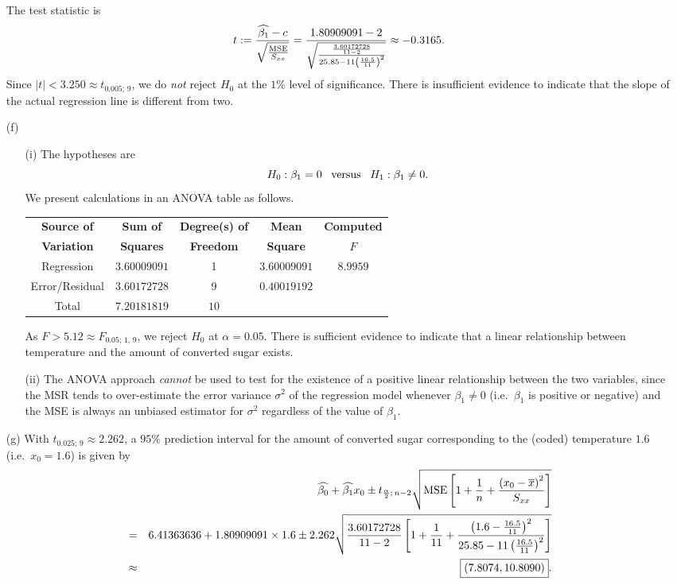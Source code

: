 \documentclass[11pt]{article}
\begin{document}
\begin{enumerate}
$$$$
The test statistic is
$$
t := \frac{\widehat{\beta_1} - c}{\sqrt{\frac{{\rm MSE}}{S_{xx}}}} = \frac{1.80909091 - 2}{\sqrt{\frac{\frac{3.60172728}{11 - 2}}{25.85 - 11\left(\frac{16.5}{11}\right)^2}}} \approx -0.3165.
$$
Since $|t| < 3.250 \approx t_{0.005;\,9}$, we do {\em not\/} reject $H_0$ at the $1\%$ level of significance. There is insufficient evidence to indicate that the slope of the actual regression line is different from two.
\item[(f)]
\begin{enumerate}
\item[(i)]
The hypotheses are
$$
H_0 : \beta_1 = 0 \ \ \, {\rm versus} \ \ \,  H_1 : \beta_1 \ne 0.
$$
We present calculations in an ANOVA table as follows.
\begin{center}
\begin{tabular}{|ccccc|} \hline
{\bf Source of} & {\bf Sum of} & {\bf Degree(s) of} & {\bf Mean} & {\bf Computed} \\
{\bf Variation} & {\bf Squares} & {\bf Freedom} & {\bf Square} & {\bf $F$} \\ \hline\hline
Regression & $3.60009091$ & 1 & $3.60009091$ & $8.9959$  \\
Error/Residual & $3.60172728$  & 9 & $0.40019192$ & \\ \hline
Total & $7.20181819$ & $10$ & & \\ \hline
\end{tabular}
\end{center}
As $F > 5.12 \approx F_{0.05;\,1,\,9}$, we reject $H_0$ at $\alpha = 0.05$. There is sufficient evidence to indicate that a linear relationship between temperature and the amount of converted sugar exists.
\item[(ii)]
The ANOVA approach {\em cannot\/} be used to test for the existence of a positive linear relationship between the two variables, since the MSR tends to over-estimate the error variance $\sigma^2$ of the regression model whenever $\beta_1 \ne 0$ (i.e.~$\beta_1$ is positive or negative) and the MSE is always an unbiased estimator for $\sigma^2$ regardless of the value of $\beta_1$.
\end{enumerate}
\item[(g)]
With $t_{0.025;\,9} \approx 2.262$, a $95\%$ prediction interval for the amount of converted sugar corresponding to the (coded) temperature $1.6$ (i.e.~$x_0 = 1.6$) is given by
\begin{eqnarray*}
 & & \widehat{\beta_0} + \widehat{\beta_1}x_0 \pm t_{\frac{\alpha}{2};\,n - 2}\sqrt{{\rm MSE}\left[1 + \frac{1}{n} + \frac{\left(x_0 - \overline{x}\right)^2}{S_{xx}}\right]} \\
& = & 6.41363636 + 1.80909091 \times 1.6 \pm 2.262\sqrt{\frac{3.60172728}{11 - 2}\left[1 + \frac{1}{11} + \frac{\left(1.6 - \frac{16.5}{11}\right)^2}{25.85 - 11\left(\frac{16.5}{11}\right)^2}\right]} \\
& \approx & \fbox{$(7.8074, 10.8090)$}.
\end{eqnarray*}
\end{enumerate}
\end{document}
